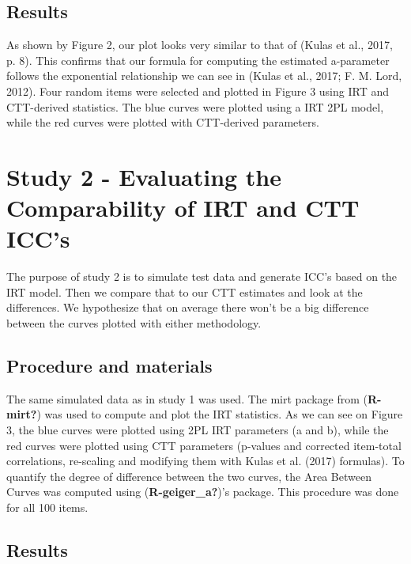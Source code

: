 \documentclass[
  man]{apa6}
\begin{document}
\hypertarget{results}{%
\subsection{Results}\label{results}}

As shown by Figure 2, our plot looks very similar to that of (Kulas et al., 2017, p. 8). This confirms that our formula for computing the estimated a-parameter follows the exponential relationship we can see in (Kulas et al., 2017; F. M. Lord, 2012). Four random items were selected and plotted in Figure 3 using IRT and CTT-derived statistics. The blue curves were plotted using a IRT 2PL model, while the red curves were plotted with CTT-derived parameters.

\hypertarget{study-2---evaluating-the-comparability-of-irt-and-ctt-iccs}{%
\section{Study 2 - Evaluating the Comparability of IRT and CTT ICC's}\label{study-2---evaluating-the-comparability-of-irt-and-ctt-iccs}}

The purpose of study 2 is to simulate test data and generate ICC's based on the IRT model. Then we compare that to our CTT estimates and look at the differences. We hypothesize that on average there won't be a big difference between the curves plotted with either methodology.

\hypertarget{procedure-and-materials}{%
\subsection{Procedure and materials}\label{procedure-and-materials}}

The same simulated data as in study 1 was used. The mirt package from (\textbf{R-mirt?}) was used to compute and plot the IRT statistics. As we can see on Figure 3, the blue curves were plotted using 2PL IRT parameters (a and b), while the red curves were plotted using CTT parameters (p-values and corrected item-total correlations, re-scaling and modifying them with Kulas et al. (2017) formulas). To quantify the degree of difference between the two curves, the Area Between Curves was computed using (\textbf{R-geiger\_a?})'s package. This procedure was done for all 100 items.

\hypertarget{results-1}{%
\subsection{Results}\label{results-1}}
\end{document}
